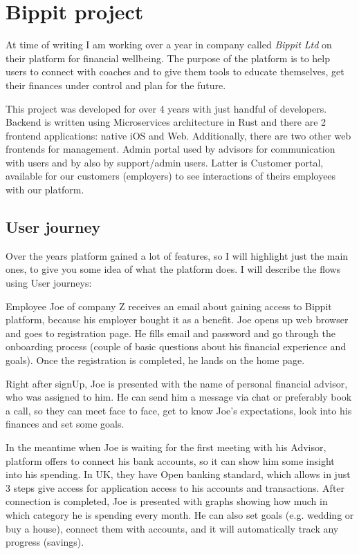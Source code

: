 \section{Bippit project}
At time of writing I am working over a year in company called \textit{Bippit Ltd}\cite{BIPPIT} on their platform for financial wellbeing. The purpose of the platform is to help users to connect with coaches and to give them tools to educate themselves, get their finances under control and plan for the future.

This project was developed for over 4 years with just handful of developers. Backend is written using Microservices architecture in Rust and there are 2 frontend applications: native iOS and Web. Additionally, there are two other web frontends for management. Admin portal used by advisors for communication with users and by also by support/admin users. Latter is Customer portal, available for our customers (employers) to see interactions of theirs employees with our platform.

\subsection{User journey}
Over the years platform gained a lot of features, so I will highlight just the main ones, to give you some idea of what the platform does. I will describe the flows using User journeys:

\begin{example}[Sign Up]
    Employee Joe of company Z receives an email about gaining access to Bippit platform, because his employer bought it as a benefit. Joe opens up web browser and goes to registration page. He fills email and password and go through the onboarding process (couple of basic questions about his financial experience and goals). Once the registration is completed, he lands on the home page.
\end{example}

\begin{example}[Advisor]
    Right after signUp, Joe is presented with the name of personal financial advisor, who was assigned to him. He can send him a message via chat or preferably book a call, so they can meet face to face, get to know Joe's expectations, look into his finances and set some goals.
\end{example}

\begin{example}[Analyse]
    In the meantime when Joe is waiting for the first meeting with his Advisor, platform offers to connect his bank accounts, so it can show him some insight into his spending. In UK, they have Open banking standard, which allows in just 3 steps give access for application access to his accounts and transactions. After connection is completed, Joe is presented with graphs showing how much in which category he is spending every month. He can also set goals (e.g. wedding or buy a house), connect them with accounts, and it will automatically track any progress (savings).
\end{example}

